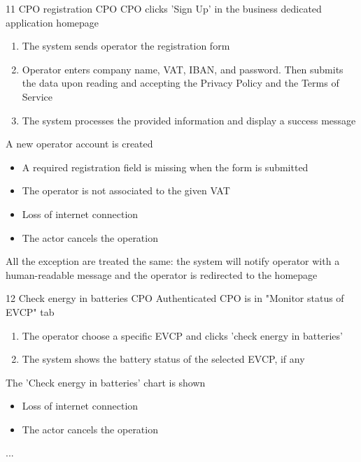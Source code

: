 \usecase
{11}
{CPO registration} %
{CPO} %
{CPO clicks 'Sign Up' in the business dedicated application homepage} %
{ %
    \begin{enumerate}
        \item The system sends operator the registration form
        \item Operator enters company name, VAT, IBAN, and password. Then submits the data upon reading and accepting the Privacy Policy and the Terms of Service
        \item The system processes the provided information and display a success message
    \end{enumerate}
}
{A new operator account is created} %
{ %
    \begin{itemize}
        \item A required registration field is missing when the form is submitted
        \item The operator is not associated to the given VAT
        \item Loss of internet connection
        \item The actor cancels the operation
    \end{itemize}
}
{ %
    All the exception are treated the same: the system will notify operator with a human-readable message and the operator is redirected to the homepage
}

\usecase
{12}
{Check energy in batteries} %
{CPO} %
{Authenticated CPO is in "Monitor status of EVCP" tab} %
{ %
    \begin{enumerate}
        \item The operator choose a specific EVCP and clicks 'check energy in batteries'
        \item The system shows the battery status of the selected EVCP, if any
    \end{enumerate}
}
{The 'Check energy in batteries' chart is shown} %
{ %
    \begin{itemize}
        \item Loss of internet connection
        \item The actor cancels the operation
    \end{itemize}
}
{ %
    ...
}

